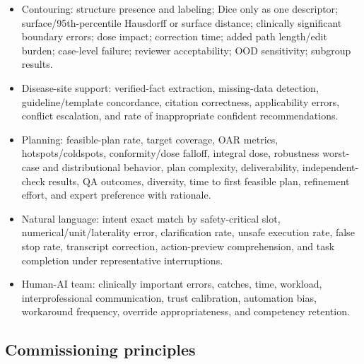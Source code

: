 \documentclass[11pt,letterpaper]{article}
\begin{document}
\begin{itemize}
\item Contouring: structure presence and labeling; Dice only as one descriptor; surface\slash\allowbreak{}95th-percentile Hausdorff or surface distance; clinically significant boundary errors; dose impact; correction time; added path length\slash\allowbreak{}edit burden; case-level failure; reviewer acceptability; OOD sensitivity; subgroup results.
\item Disease-site support: verified-fact extraction, missing-data detection, guideline\slash\allowbreak{}template concordance, citation correctness, applicability errors, conflict escalation, and rate of inappropriate confident recommendations.
\item Planning: feasible-plan rate, target coverage, OAR metrics, hotspots\slash\allowbreak{}coldspots, conformity\slash\allowbreak{}dose falloff, integral dose, robustness worst-case and distributional behavior, plan complexity, deliverability, independent-check results, QA outcomes, diversity, time to first feasible plan, refinement effort, and expert preference with rationale.
\item Natural language: intent exact match by safety-critical slot, numerical\slash\allowbreak{}unit\slash\allowbreak{}laterality error, clarification rate, unsafe execution rate, false stop rate, transcript correction, action-preview comprehension, and task completion under representative interruptions.
\item Human-AI team: clinically important errors, catches, time, workload, interprofessional communication, trust calibration, automation bias, workaround frequency, override appropriateness, and competency retention.
\end{itemize}

\subsection{Commissioning principles}
\end{document}
